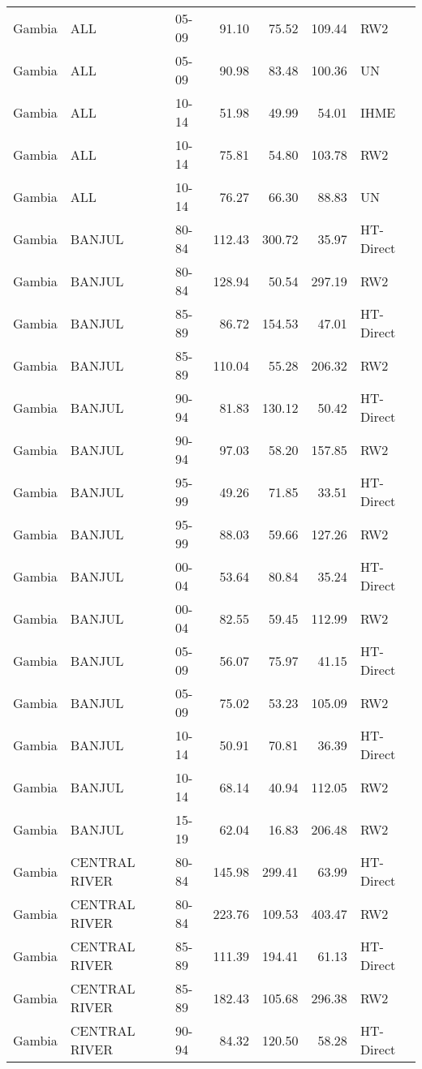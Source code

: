 \begin{longtable}{lllrrrl}
  Gambia & ALL & 05-09 & 91.10 & 75.52 & 109.44 & RW2 \\ 
  Gambia & ALL & 05-09 & 90.98 & 83.48 & 100.36 & UN \\ 
  Gambia & ALL & 10-14 & 51.98 & 49.99 & 54.01 & IHME \\ 
  Gambia & ALL & 10-14 & 75.81 & 54.80 & 103.78 & RW2 \\ 
  Gambia & ALL & 10-14 & 76.27 & 66.30 & 88.83 & UN \\ 
  Gambia & BANJUL & 80-84 & 112.43 & 300.72 & 35.97 & HT-Direct \\ 
  Gambia & BANJUL & 80-84 & 128.94 & 50.54 & 297.19 & RW2 \\ 
  Gambia & BANJUL & 85-89 & 86.72 & 154.53 & 47.01 & HT-Direct \\ 
  Gambia & BANJUL & 85-89 & 110.04 & 55.28 & 206.32 & RW2 \\ 
  Gambia & BANJUL & 90-94 & 81.83 & 130.12 & 50.42 & HT-Direct \\ 
  Gambia & BANJUL & 90-94 & 97.03 & 58.20 & 157.85 & RW2 \\ 
  Gambia & BANJUL & 95-99 & 49.26 & 71.85 & 33.51 & HT-Direct \\ 
  Gambia & BANJUL & 95-99 & 88.03 & 59.66 & 127.26 & RW2 \\ 
  Gambia & BANJUL & 00-04 & 53.64 & 80.84 & 35.24 & HT-Direct \\ 
  Gambia & BANJUL & 00-04 & 82.55 & 59.45 & 112.99 & RW2 \\ 
  Gambia & BANJUL & 05-09 & 56.07 & 75.97 & 41.15 & HT-Direct \\ 
  Gambia & BANJUL & 05-09 & 75.02 & 53.23 & 105.09 & RW2 \\ 
  Gambia & BANJUL & 10-14 & 50.91 & 70.81 & 36.39 & HT-Direct \\ 
  Gambia & BANJUL & 10-14 & 68.14 & 40.94 & 112.05 & RW2 \\ 
  Gambia & BANJUL & 15-19 & 62.04 & 16.83 & 206.48 & RW2 \\ 
  Gambia & CENTRAL RIVER & 80-84 & 145.98 & 299.41 & 63.99 & HT-Direct \\ 
  Gambia & CENTRAL RIVER & 80-84 & 223.76 & 109.53 & 403.47 & RW2 \\ 
  Gambia & CENTRAL RIVER & 85-89 & 111.39 & 194.41 & 61.13 & HT-Direct \\ 
  Gambia & CENTRAL RIVER & 85-89 & 182.43 & 105.68 & 296.38 & RW2 \\ 
  Gambia & CENTRAL RIVER & 90-94 & 84.32 & 120.50 & 58.28 & HT-Direct \\ 

\end{longtable}
